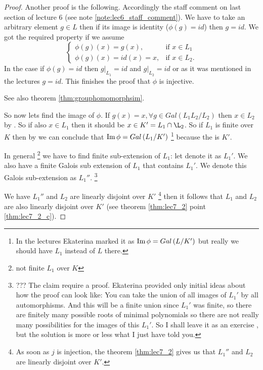 \begin{theorem}
\begin{proof}
{      Another proof is the following. Accordingly the staff comment on
      last section of lecture 6 (see 
      note \ref{note:lec6_staff_comment}). We have to take an arbitrary
      element $g \in L$ then if its image is identity ($\phi(g) = id$)
      then $g = id$. We got the required property if we assume
      \[
      \begin{cases}
        \phi(g)\left(x\right) = g\left(x\right),& \text{if } x \in
        L_1\\
        \phi(g)\left(x\right) = id\left(x\right) = x,& \text{if } x \in
        L_2.
      \end{cases}
      \]
      In the case if $\phi(g) = id$ then $\left.g\right|_{L_1} = id$
      and $\left.g\right|_{L_2} = id$ or as it was mentioned in the
      lectures $g = id$. This finishes the proof that $\phi$ is
      injective.

      See also theorem \ref{thm:grouphomomorphsim}.
    }

    So now lets find the image of $\phi$. If $g\left(x\right) = x,
    \forall g \in Gal\left(L_1 L_2/ L_2\right)$ then $x \in L_2$ by
    . So if also $x \in L_1$ then it
    should be $x \in K' = L_1 \cap \L_2$. So if $L_1$ is finite over
    $K$ then by    we can conclude
    that $\operatorname{Im} \phi = Gal\left(L_1/K'\right)$
    \footnote{
      In the lectures Ekaterina marked it as $\operatorname{Im} \phi =
      Gal\left(L/K'\right)$ but really we should have $L_1$ instead of
      $L$ there.
    }
    because the
     is $K'$.

    In general
    \footnote{
      not finite $L_1$ over $K$
    }
    we have to find finite
    sub-extension of $L_1$: let denote it as $L_1'$. We also have a
    finite Galois sub extension of $L_1$ that contains $L_1'$. We
    denote this Galois sub-extension as $L_1''$.
    \footnote{
      ??? The claim require a proof. Ekaterina provided only initial ideas
      about how the proof can look like:
      You can take the union of all images of $L_1'$ by all
      automorphisms. And this will be a finite union since $L_1'$ was
      finite, so there are finitely many possible roots of minimal
      polynomials so there are not really many possibilities for the
      images of this $L_1'$. So I shall leave it as an exercise , but the
      solution is more or less what I just have told you.
    }   

    We have
    $L_1''$ and $L_2$ are linearly disjoint over $K'$
    \footnote{
      As soon as $j$ is injection, the theorem \ref{thm:lec7_2} gives
      us that $L_1''$ and $L_2$ are linearly disjoint over $K'$. 
    }
    then it follows
    that $L_1$ and $L_2$ are also linearly disjoint over $K'$
    (see theorem \ref{thm:lec7_2} point \ref{thm:lec7_2_c}).


\end{proof}
\end{theorem}

